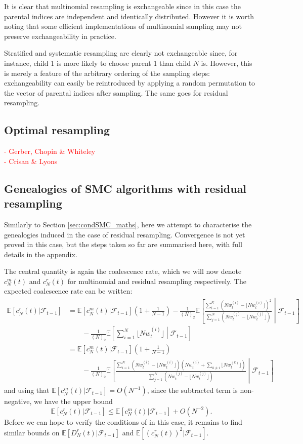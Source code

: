 \documentclass[fleqn]{article}
\theoremstyle{definition}
\newcommand{\E}{\mathbb{E}}
\newcommand{\F}{\mathcal{F}_{t-1}}
\newcommand{\wt}[2][t]{w_{#1}^{(#2)}}
\begin{document}
It is clear that multinomial resampling is exchangeable since in this case the parental indices are independent and identically distributed. However it is worth noting that some efficient implementations of multinomial sampling may not preserve exchangeability in practice.

Stratified and systematic resampling are clearly not exchangeable since, for instance, child 1 is more likely to choose parent 1 than child $N$ is. However, this is merely a feature of the arbitrary ordering of the sampling steps: exchangeability can easily be reintroduced by applying a random permutation to the vector of parental indices after sampling.
The same goes for residual resampling.

\subsection{Optimal resampling}
\textcolor{red}{
- Gerber, Chopin \& Whiteley\\
- Crisan \& Lyons\\
}

\subsection{Genealogies of SMC algorithms with residual resampling}
Similarly to Section \ref{sec:condSMC_maths}, here we attempt to characterise the genealogies induced in the case of residual resampling. Convergence is not yet proved in this case, but the steps taken so far are summarised here, with full details in the appendix.

The central quantity is again the coalescence rate, which we will now denote $c_N^m(t)$ and $c_N^r(t)$ for multinomial and residual resampling respectively.
The expected coalescence rate can be written:
\begin{align*}
\E[c^r_N(t) |\F]
&= \E[c^{m}_N(t) |\F] \left( 1 + \frac{1}{N-1} \right) - \frac{1}{(N)_2}  \E\left[ \frac{\sum_{i=1}^{N} (N\wt{i} - \lfloor N\wt{i}\rfloor)^2}{\sum_{j=1}^{N} (N\wt{j} - \lfloor N\wt{j}\rfloor)} \middle|\F \right] \\
&\qquad -\frac{1}{(N)_2} \E \left[ \sum_{i=1}^{N} \lfloor N\wt{i}\rfloor \middle|\F \right] \\
&= \E[c^{m}_N(t) |\F] \left( 1 + \frac{1}{N-1} \right) \\
&\qquad- \frac{1}{(N)_2}  \E\left[ \frac{\sum_{i=1}^{N} \left(N\wt{i} - \lfloor N\wt{i} \rfloor \right) \left( N\wt{i} + \sum_{k\neq i} \lfloor N\wt{k} \rfloor \right) }{\sum_{j=1}^{N} \left(N\wt{j} - \lfloor N\wt{j}\rfloor\right)} \middle|\F \right]  
\end{align*}
and using that $\E[c^{m}_N(t) |\F] = O(N^{-1})$, since the subtracted term is non-negative, we have the upper bound
\begin{equation}\label{eq:residual_coalrate}
\E[c^r_N(t) |\F] \leq \E[c^m_N(t) |\F] + O(N^{-2}).
\end{equation}
Before we can hope to verify the conditions of \citet[Theorem 1]{koskela2018} in this case, it remains to find similar bounds on $\E[D^r_N(t) |\F]$ and $\E[(c^r_N(t))^2 |\F]$.
\end{document}
